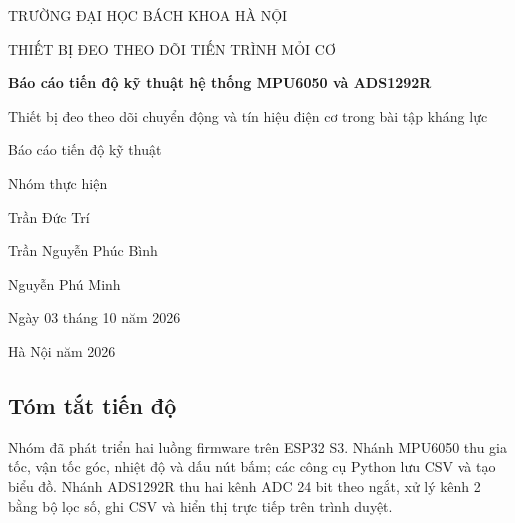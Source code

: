 \documentclass[12pt,letterpaper]{article}
\begin{document}
\begin{titlepage}
\centering
{\fontsize{14}{18}\selectfont TRƯỜNG ĐẠI HỌC BÁCH KHOA HÀ NỘI\par}
\vspace{0.6cm}
{\fontsize{14}{18}\selectfont THIẾT BỊ ĐEO THEO DÕI TIẾN TRÌNH MỎI CƠ\par}
\vspace{0.9cm}
{\fontsize{24}{29}\selectfont\bfseries Báo cáo tiến độ kỹ thuật hệ thống MPU6050 và ADS1292R\par}
\vspace{0.7cm}
{\fontsize{14}{18}\selectfont Thiết bị đeo theo dõi chuyển động và tín hiệu điện cơ trong bài tập kháng lực\par}
\vspace{0.5cm}
{\fontsize{14}{18}\selectfont Báo cáo tiến độ kỹ thuật\par}
\vspace{0.5cm}
Nhóm thực hiện\par
Trần Đức Trí\par
Trần Nguyễn Phúc Bình\par
Nguyễn Phú Minh\par
\vspace{0.6cm}
Ngày 03 tháng 10 năm 2026\par
Hà Nội năm 2026\par
\thispagestyle{plain}
\end{titlepage}
\setcounter{page}{2}





\tableofcontents

\vspace{5pt}

\subsection*{Tóm tắt tiến độ}

Nhóm đã phát triển hai luồng firmware trên ESP32 S3. Nhánh MPU6050 thu gia tốc, vận tốc góc, nhiệt độ và dấu nút bấm; các công cụ Python lưu CSV và tạo biểu đồ. Nhánh ADS1292R thu hai kênh ADC 24 bit theo ngắt, xử lý kênh 2 bằng bộ lọc số, ghi CSV và hiển thị trực tiếp trên trình duyệt.
\end{document}
